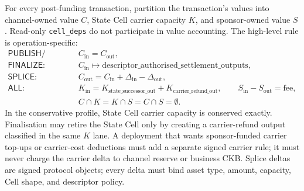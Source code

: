 \documentclass[a4paper,11pt]{article}
\begin{document}
For every post-funding transaction, partition the transaction's values into channel-owned value $C$, State Cell carrier capacity $K$, and sponsor-owned value $S$. Read-only \texttt{cell\_deps} do not participate in value accounting. The high-level rule is operation-specific:
\[
\begin{aligned}
\textsf{PUBLISH/SUPERSEDE:}\quad &
C_{\mathrm{in}} = C_{\mathrm{out}},
\\[0.25em]
\textsf{FINALIZE:}\quad &
C_{\mathrm{in}} \mapsto
\mathrm{descriptor\_authorised\_settlement\_outputs},
\\[0.25em]
\textsf{SPLICE:}\quad &
C_{\mathrm{out}} =
C_{\mathrm{in}} + \Delta_{\mathrm{in}} - \Delta_{\mathrm{out}},
\\[0.25em]
\textsf{ALL:}\quad &
K_{\mathrm{in}} =
K_{\mathrm{state\_successor\_out}}+
K_{\mathrm{carrier\_refund\_out}},
\qquad
S_{\mathrm{in}} - S_{\mathrm{out}} = \mathrm{fee},
\\
&
C \cap K = K \cap S = C \cap S = \emptyset.
\end{aligned}
\]
In the conservative profile, State Cell carrier capacity is conserved exactly.
Finalisation may retire the State Cell only by creating a carrier-refund output
classified in the same $K$ lane. A deployment that wants sponsor-funded carrier
top-ups or carrier-cost deductions must add a separate signed carrier rule; it
must never charge the carrier delta to channel reserve or business CKB. Splice
deltas are signed protocol objects; every delta must bind asset type, amount,
capacity, Cell shape, and descriptor policy.
\end{document}

